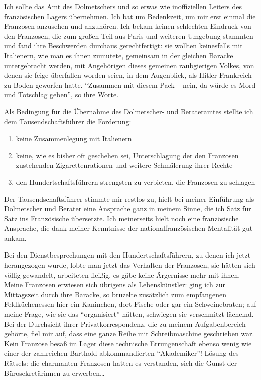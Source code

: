 \documentclass[a5paper,pagesize,10pt,twoside=true]{scrbook}
\renewcommand{\marginpar}[2][]{}
\begin{document}
Ich sollte das Amt des Dolmetschers und so etwas wie inoffiziellen Leiters des französischen Lagers übernehmen. Ich bat um Bedenkzeit, um mir erst einmal die Franzosen anzusehen und anzuhören. Ich bekam keinen schlechten Eindruck \marginpar{48}von den Franzosen, die zum großen Teil aus Paris und weiteren Umgebung stammten und fand ihre Beschwerden durchaus gerechtfertigt: sie wollten keinesfalls mit Italienern, wie man es ihnen zumutete, gemeinsam in der gleichen Baracke untergebracht werden, mit Angehörigen dieses gemeinen raubgierigen Volkes, von denen sie feige überfallen worden seien, in dem Augenblick, als Hitler Frankreich zu Boden geworfen hatte. \enquote{Zusammen mit diesem Pack -- nein, da würde es Mord und Totschlag geben}, so ihre Worte.

Als Bedingung für die Übernahme des Dolmetscher- und Berateramtes stellte ich dem Tausendschaftsführer die Forderung:

\begin{enumerate}
	\item keine Zusammenlegung mit Italienern
	\item keine, wie es bisher oft geschehen sei, Unterschlagung der den Franzosen zustehenden Zigarettenrationen und weitere Schmälerung ihrer Rechte
	\item den Hundertschaftsführern strengsten zu verbieten, die Franzosen zu schlagen
\end{enumerate}

Der Tausendschaftsführer stimmte mir restlos zu, hielt bei meiner Einführung als Dolmetscher und Berater eine Ansprache ganz in meinem Sinne, die ich Satz für Satz ins Französische \marginpar{49} übersetzte. Ich meinerseits hielt noch eine französische Ansprache, die dank meiner Kenntnisse der nationalfranzösischen Mentalität gut ankam.

Bei den Dienstbesprechungen mit den Hundertschaftsführern, zu denen ich jetzt herangezogen wurde, lobte man jetzt das Verhalten der Franzosen, sie hätten sich völlig gewandelt, arbeiteten fleißig, es gäbe keine Ärgernisse mehr mit ihnen. Meine Franzosen erwiesen sich übrigens als Lebenskünstler: ging ich zur Mittagszeit durch ihre Baracke, so bruzelte zusätzlich zum empfangenen Feldküchenessen hier ein Kaninchen, dort Fische oder gar ein Schweinebraten; auf meine Frage, wie sie das \enquote{organisiert} hätten, schwiegen sie verschmitzt lächelnd. Bei der Durchsicht ihrer Privatkorrespondenz, die zu meinem Aufgabenbereich gehörte, fiel mir auf, dass eine ganze Reihe mit Schreibmaschine geschrieben war. Kein Franzose besaß im Lager diese technische Errungenschaft ebenso wenig wie einer der zahlreichen Barthold abkommandierten \enquote{Akademiker}! Lösung des Rätsels: die charmanten Franzosen hatten es verstanden, sich die Gunst der Bürosekretärinnen zu erwerben\dots
\end{document}

